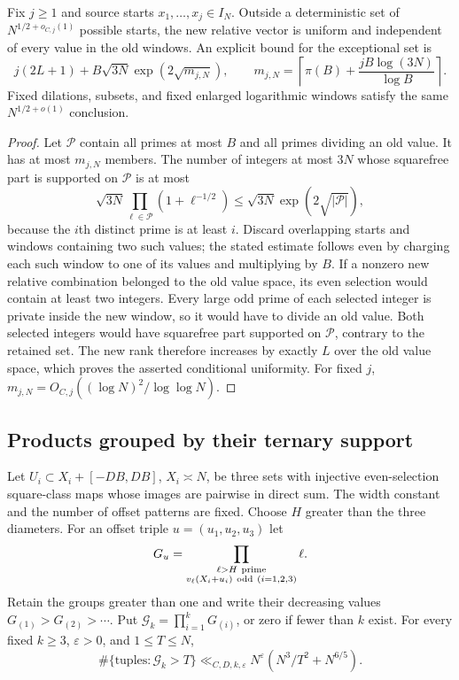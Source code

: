 \begin{proposition}
\label{p1:arith:fixed-branching}
Fix $j\geq1$ and source starts $x_1,\ldots,x_j\in I_N$.
Outside a deterministic set of $N^{1/2+o_{C,j}(1)}$ possible starts,
the new relative vector is uniform and independent of every value in
the old windows.  An explicit bound for the exceptional set is
\[
 j(2L+1)+B\sqrt{3N}\exp(2\sqrt{m_{j,N}}),\qquad
 m_{j,N}=\left\lceil\pi(B)+\frac{jB\log(3N)}{\log B}\right\rceil.
\]
Fixed dilations, subsets, and fixed enlarged logarithmic windows satisfy
the same $N^{1/2+o(1)}$ conclusion.
\end{proposition}

\begin{proof}
Let $\mathcal P$ contain all primes at most $B$ and all primes dividing
an old value.  It has at most $m_{j,N}$ members.
The number of integers at most $3N$ whose squarefree part is supported
on $\mathcal P$ is at most
\[
 \sqrt{3N}\prod_{\ell\in\mathcal P}(1+\ell^{-1/2})
 \leq\sqrt{3N}\exp(2\sqrt{|\mathcal P|}),
\]
because the $i$th distinct prime is at least $i$.
Discard overlapping starts and windows containing two such values;
the stated estimate follows even by charging each such window to one
of its values and multiplying by $B$.
If a nonzero new relative combination belonged to the old value space,
its even selection would contain at least two integers.  Every large
odd prime of each selected integer is private inside the new window,
so it would have to divide an old value.  Both selected integers would
have squarefree part supported on $\mathcal P$, contrary to the retained
set.  The new rank therefore increases by exactly $L$ over the old
value space, which proves the asserted conditional uniformity.
For fixed $j$, $m_{j,N}=O_{C,j}((\log N)^2/\log\log N)$.
\end{proof}

\subsection{Products grouped by their ternary support}

\begin{proposition}\label{p1:arith:ternary-budget}
Let $U_i\subset X_i+[-DB,DB]$, $X_i\asymp N$, be three sets with
injective even-selection square-class maps whose images are pairwise
in direct sum.  The width constant and the number of offset patterns
are fixed.  Choose $H$ greater than the three diameters.  For an offset
triple $u=(u_1,u_2,u_3)$ let
\[
 G_u=\prod_{\substack{\ell>H\ {\rm prime}\\
       v_\ell(X_i+u_i)\ {\rm odd}\ (i=1,2,3)}}\ell.
\]
Retain the groups greater than one and write their decreasing values
$G_{(1)}>G_{(2)}>\cdots$.  Put
$\mathcal G_k=\prod_{i=1}^kG_{(i)}$, or zero if fewer than $k$ exist.
For every fixed $k\geq3$, $\varepsilon>0$, and $1\leq T\leq N$,
\begin{equation}\label{p1:arith:ternarycount}
 \#\{\text{tuples}:\mathcal G_k>T\}
 \ll_{C,D,k,\varepsilon}N^\varepsilon
      (N^3/T^2+N^{6/5}).
\end{equation}
\end{proposition}


